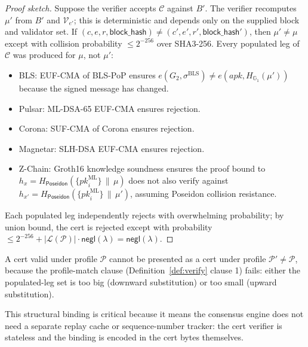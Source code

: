 \begin{proof}[Proof sketch]
Suppose the verifier accepts $\mathcal{C}$ against $B'$. The verifier
recomputes $\mu'$ from $B'$ and $\mathcal{V}_{e'}$; this is
deterministic and depends only on the supplied block and validator
set. If $(c, e, r, \mathsf{block\_hash}) \neq (c', e', r',
\mathsf{block\_hash'})$, then $\mu' \neq \mu$ except with collision
probability $\leq 2^{-256}$ over SHA3-256. Every populated leg of
$\mathcal{C}$ was produced for $\mu$, not $\mu'$:

\begin{itemize}[leftmargin=2em,nosep]
\item BLS: EUF-CMA of BLS-PoP ensures
      $e(G_2, \sigma^{\mathrm{BLS}}) \neq e(\mathit{apk}, H_{\mathbb{G}_1}(\mu'))$
      because the signed message has changed.
\item Pulsar: ML-DSA-65 EUF-CMA ensures rejection.
\item Corona: SUF-CMA of Corona ensures rejection.
\item Magnetar: SLH-DSA EUF-CMA ensures rejection.
\item Z-Chain: Groth16 knowledge soundness ensures the proof bound to
      $h_x = H_{\mathsf{Poseidon}}(\{\mathit{pk}_i^{\mathrm{ML}}\} \,\|\, \mu)$
      does not also verify against $h_{x'} =
      H_{\mathsf{Poseidon}}(\{\mathit{pk}_i^{\mathrm{ML}}\} \,\|\, \mu')$,
      assuming Poseidon collision resistance.
\end{itemize}

Each populated leg independently rejects with overwhelming probability;
by union bound, the cert is rejected except with probability
$\leq 2^{-256} + |\mathcal{L}(\mathcal{P})| \cdot \mathsf{negl}(\lambda)
= \mathsf{negl}(\lambda)$.
\end{proof}

\begin{corollary}
A cert valid under profile $\mathcal{P}$ cannot be presented as a
cert under profile $\mathcal{P}' \neq \mathcal{P}$, because the
profile-match clause (Definition~\ref{def:verify} clause 1) fails:
either the populated-leg set is too big (downward substitution) or
too small (upward substitution).
\end{corollary}

This structural binding is critical because it means the consensus
engine does not need a separate replay cache or sequence-number
tracker: the cert verifier is stateless and the binding is encoded
in the cert bytes themselves.
